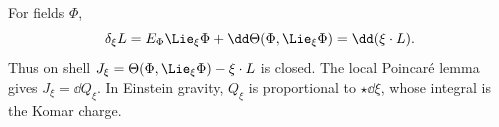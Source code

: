 \begin{enumerate}[leftmargin=2.8em,itemsep=1.2em]
For fields \(\Phi\),
\[
 \delta_\xi L=E_\Phi\Lie_\xi\Phi+\dd\Theta(\Phi,\Lie_\xi\Phi)
 =\dd(\xi\mathbin{\cdot}L).
\]
Thus on shell
\(J_\xi=\Theta(\Phi,\Lie_\xi\Phi)-\xi\mathbin{\cdot}L\) is closed.  The
local Poincar\'e lemma gives \(J_\xi=\dd Q_\xi\).  In Einstein gravity,
\(Q_\xi\) is proportional to \(\star\dd\xi\), whose integral is the Komar
charge.
\end{enumerate}
